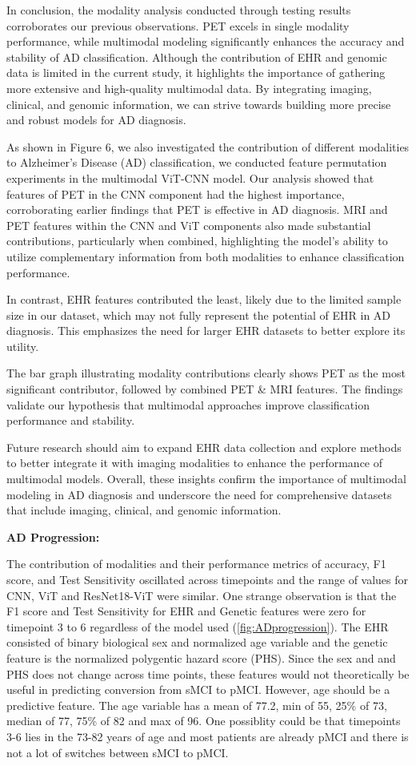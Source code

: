 In conclusion, the modality analysis conducted through testing results corroborates our previous observations. PET excels in single modality performance, while multimodal modeling significantly enhances the accuracy and stability of AD classification. Although the contribution of EHR and genomic data is limited in the current study, it highlights the importance of gathering more extensive and high-quality multimodal data. By integrating imaging, clinical, and genomic information, we can strive towards building more precise and robust models for AD diagnosis. 

As shown in Figure 6, we also investigated the contribution of different modalities to Alzheimer's Disease (AD) classification, we conducted feature permutation experiments in the multimodal ViT-CNN model. Our analysis showed that features of PET in the CNN component had the highest importance, corroborating earlier findings that PET is effective in AD diagnosis. MRI and PET features within the CNN and ViT components also made substantial contributions, particularly when combined, highlighting the model's ability to utilize complementary information from both modalities to enhance classification performance. 

In contrast, EHR features contributed the least, likely due to the limited sample size in our dataset, which may not fully represent the potential of EHR in AD diagnosis. This emphasizes the need for larger EHR datasets to better explore its utility. 

The bar graph illustrating modality contributions clearly shows PET as the most significant contributor, followed by combined PET \& MRI features. The findings validate our hypothesis that multimodal approaches improve classification performance and stability. 

Future research should aim to expand EHR data collection and explore methods to better integrate it with imaging modalities to enhance the performance of multimodal models. Overall, these insights confirm the importance of multimodal modeling in AD diagnosis and underscore the need for comprehensive datasets that include imaging, clinical, and genomic information. 

\textbf{AD Progression: }

The contribution of modalities and their performance metrics of accuracy, F1 score, and Test Sensitivity oscillated across timepoints and the range of values for CNN, ViT and ResNet18-ViT were similar. One strange observation is that the F1 score and Test Sensitivity for EHR and Genetic features were zero for timepoint 3 to 6 regardless of the model used (\autoref{fig:ADprogression}). The EHR consisted of binary biological sex and normalized age variable and the genetic feature is the normalized polygentic hazard score (PHS). Since the sex and and PHS does not change across time points, these features would not theoretically be useful in predicting conversion from sMCI to pMCI. However, age should be a predictive feature. The age variable has a mean of 77.2, min of 55, 25\% of 73, median of 77, 75\% of 82 and max of 96. One possiblity could be that timepoints 3-6 lies in the 73-82 years of age and most patients are already pMCI and there is not a lot of switches between sMCI to pMCI. 

\